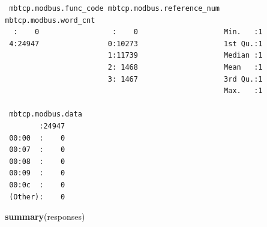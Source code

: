 \documentclass[12pt,]{article}
\newenvironment{Shaded}{\begin{snugshade}}{\end{snugshade}}
\newcommand{\KeywordTok}[1]{\textcolor[rgb]{0.13,0.29,0.53}{\textbf{{#1}}}}
\newcommand{\NormalTok}[1]{{#1}}
\begin{document}
\begin{verbatim}
 mbtcp.modbus.func_code mbtcp.modbus.reference_num mbtcp.modbus.word_cnt
  :    0                 :    0                    Min.   :1            
 4:24947                0:10273                    1st Qu.:1            
                        1:11739                    Median :1            
                        2: 1468                    Mean   :1            
                        3: 1467                    3rd Qu.:1            
                                                   Max.   :1            
                                                                        
 mbtcp.modbus.data
        :24947    
 00:00  :    0    
 00:07  :    0    
 00:08  :    0    
 00:09  :    0    
 00:0c  :    0    
 (Other):    0    
\end{verbatim}

\begin{Shaded}
\begin{Highlighting}[]
\KeywordTok{summary}\NormalTok{(responses)}
\end{Highlighting}
\end{Shaded}
\end{document}
